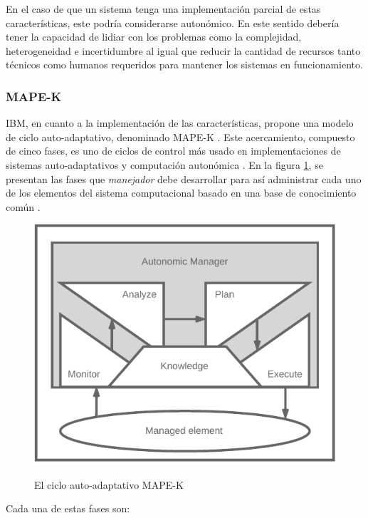 En el caso de que un sistema tenga una implementación parcial de estas características, este podría considerarse autonómico. En este sentido debería tener la capacidad de lidiar con los problemas como la complejidad, heterogeneidad e incertidumbre \cite{emerging_2005} al igual que reducir la cantidad de recursos tanto técnicos como humanos requeridos para mantener los sistemas en funcionamiento.

\subsubsection{MAPE-K}


IBM, en cuanto a la implementación de las características, propone una modelo de ciclo auto-adaptativo, denominado MAPE-K \cite{Krikava2013}. Este acercamiento, compuesto de cinco fases, es uno de ciclos de control más usado en implementaciones de sistemas auto-adaptativos y computación autonómica \cite{Arcaini_2015}. En la figura \ref{fig:mapek}, se presentan las fases que \textit{manejador} debe desarrollar para así administrar cada uno de los elementos del sistema computacional basado en una base de conocimiento común \cite{alessandra_2010}. 

\begin{figure}[H]
    \centering
    \caption{El ciclo auto-adaptativo MAPE-K \protect\cite{alessandra_2010}} 
    \includegraphics[width=0.8\linewidth]{images/mape-k.pdf}
    \label{fig:mapek}
\end{figure}

Cada una de estas fases son:

